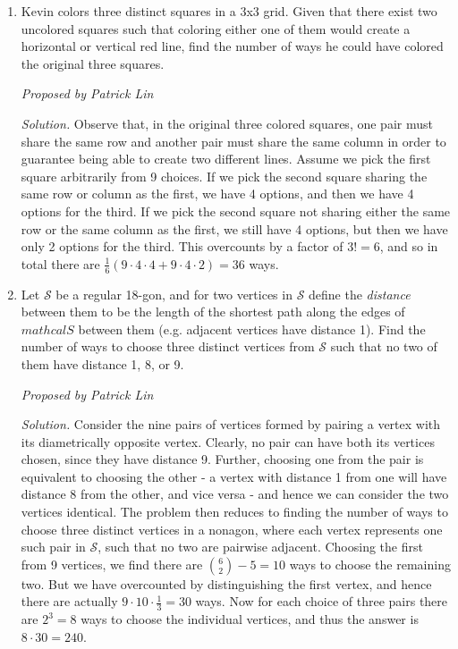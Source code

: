 \documentclass[10pt]{article}
\newcommand{\proposed}[1]
{
\vspace{5pt}
\noindent\textit{Proposed by #1}
}
\newcommand{\solution}
{
\vspace{5pt}
\noindent\textit{Solution.}\qquad
}
\begin{document}
\begin{enumerate}
\item Kevin colors three distinct squares in a 3x3 grid. Given that there exist two uncolored squares such that coloring either one of them would create a horizontal or vertical red line, find the number of ways he could have colored the original three squares.

\proposed{Patrick Lin}

\solution Observe that, in the original three colored squares, one pair must share the same row and another pair must share the same column in order to guarantee being able to create two different lines. Assume we pick the first square arbitrarily from 9 choices. If we pick the second square sharing the same row or column as the first, we have 4 options, and then we have 4 options for the third. If we pick the second square not sharing either the same row or the same column as the first, we still have 4 options, but then we have only 2 options for the third. This overcounts by a factor of $3! = 6$, and so in total there are $\tfrac16 (9\cdot4\cdot4 + 9\cdot4\cdot2) = \boxed{36}$ ways.

\item Let $\mathcal{S}$ be a regular 18-gon, and for two vertices in $\mathcal{S}$ define the \textit{distance} between them to be the length of the shortest path along the edges of $mathcal{S}$ between them (e.g. adjacent vertices have distance 1). Find the number of ways to choose three distinct vertices from $\mathcal{S}$ such that no two of them have distance 1, 8, or 9.

\proposed{Patrick Lin}

\solution Consider the nine pairs of vertices formed by pairing a vertex with its diametrically opposite vertex. Clearly, no pair can have both its vertices chosen, since they have distance 9. Further, choosing one from the pair is equivalent to choosing the other - a vertex with distance 1 from one will have distance 8 from the other, and vice versa - and hence we can consider the two vertices identical. The problem then reduces to finding the number of ways to choose three distinct vertices in a nonagon, where each vertex represents one such pair in $\mathcal{S}$, such that no two are pairwise adjacent. Choosing the first from 9 vertices, we find there are $\binom62 - 5 = 10$ ways to choose the remaining two. But we have overcounted by distinguishing the first vertex, and hence there are actually $9\cdot10\cdot\frac13 = 30$ ways. Now for each choice of three pairs there are $2^3 = 8$ ways to choose the individual vertices, and thus the answer is $8\cdot30 = \boxed{240}$.


\end{enumerate}
\end{document}
